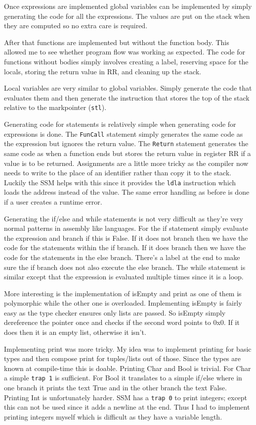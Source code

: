 \documentclass{article}
\begin{document}
Once expressions are implemented global variables can be implemented by simply generating the code for all the expressions. The values are put on the stack when they are computed so no extra care is required.

After that functions are implemented but without the function body. This allowed me to see whether program flow was working as expected. The code for functions without bodies simply involves creating a label, reserving space for the locals, storing the return value in RR, and cleaning up the stack.

Local variables are very similar to global variables. Simply generate the code that evaluates them and then generate the instruction that stores the top of the stack relative to the markpointer (\texttt{stl}).

Generating code for statements is relatively simple when generating code for expressions is done. The \texttt{FunCall} statement simply generates the same code as the expression but ignores the return value. The \texttt{Return} statement generates the same code as when a function ends but stores the return value in register RR if a value is to be returned. Assignments are a little more tricky as the compiler now needs to write to the place of an identifier rather than copy it to the stack. Luckily the SSM helps with this since it provides the \texttt{ldla} instruction which loads the address instead of the value. The same error handling as before is done if a user creates a runtime error.

Generating the if/else and while statements is not very difficult as they're very normal patterns in assembly like languages. For the if statement simply evaluate the expression and branch if this is False. If it does not branch then we have the code for the statements within the if branch. If it does branch then we have the code for the statements in the else branch. There's a label at the end to make sure the if branch does not also execute the else branch. The while statement is similar except that the expression is evaluated multiple times since it is a loop.

More interesting is the implementation of isEmpty and print as one of them is polymorphic while the other one is overloaded. Implementing isEmpty is fairly easy as the type checker ensures only lists are passed. So isEmpty simply dereference the pointer once and checks if the second word points to 0x0. If it does then it is an empty list, otherwise it isn't.

Implementing print was more tricky. My idea was to implement printing for basic types and then compose print for tuples/lists out of those. Since the types are known at compile-time this is doable. Printing Char and Bool is trivial. For Char a simple \texttt{trap 1} is sufficient. For Bool it translates to a simple if/else where in one branch it prints the text True and in the other branch the text False. Printing Int is unfortunately harder. SSM has a \texttt{trap 0} to print integers; except this can not be used since it adds a newline at the end. Thus I had to implement printing integers myself which is difficult as they have a variable length.
\end{document}
